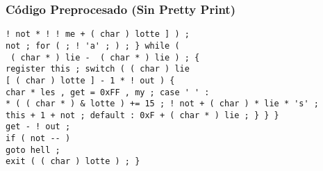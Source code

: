 \documentclass{beamer}
\begin{document}
\begin{frame}[fragile]
\frametitle{C\'odigo Preprocesado (Sin Pretty Print)}
\begin{lstlisting}[style=CStyle]
! not * ! ! me + ( char ) lotte ] ) ; 
not ; for ( ; ! 'a' ; ) ; } while ( 
 ( char * ) lie -  ( char * ) lie ) ; { 
register this ; switch ( ( char ) lie 
[ ( char ) lotte ] - 1 * ! out ) { 
char * les , get = 0xFF , my ; case ' ' : 
* ( ( char * ) & lotte ) += 15 ; ! not + ( char ) * lie * 's' ; 
this + 1 + not ; default : 0xF + ( char * ) lie ; } } } 
get - ! out ; 
if ( not -- ) 
goto hell ; 
exit ( ( char ) lotte ) ; } \end{lstlisting}
\end{frame}
\end{document}
